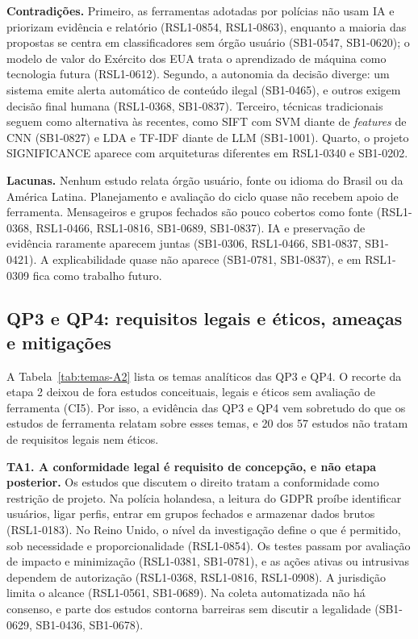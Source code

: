 \textbf{Contradições.} Primeiro, as ferramentas adotadas por polícias não
usam IA e priorizam evidência e relatório (RSL1-0854, RSL1-0863), enquanto a
maioria das propostas se centra em classificadores sem órgão usuário
(SB1-0547, SB1-0620); o modelo de valor do Exército dos EUA trata o
aprendizado de máquina como tecnologia futura (RSL1-0612). Segundo, a
autonomia da decisão diverge: um sistema emite alerta automático de conteúdo
ilegal (SB1-0465), e outros exigem decisão final humana (RSL1-0368,
SB1-0837). Terceiro, técnicas tradicionais seguem como alternativa às
recentes, como SIFT com SVM diante de \textit{features} de CNN (SB1-0827) e
LDA e TF-IDF diante de LLM (SB1-1001). Quarto, o projeto SIGNIFICANCE
aparece com arquiteturas diferentes em RSL1-0340 e SB1-0202.

\textbf{Lacunas.} Nenhum estudo relata órgão usuário, fonte ou idioma do
Brasil ou da América Latina. Planejamento e avaliação do ciclo quase não
recebem apoio de ferramenta. Mensageiros e grupos fechados são pouco
cobertos como fonte (RSL1-0368, RSL1-0466, RSL1-0816, SB1-0689, SB1-0837).
IA e preservação de evidência raramente aparecem juntas (SB1-0306,
RSL1-0466, SB1-0837, SB1-0421). A explicabilidade quase não aparece
(SB1-0781, SB1-0837), e em RSL1-0309 fica como trabalho futuro.

\subsection{QP3 e QP4: requisitos legais e éticos, ameaças e mitigações}
\label{sec:rsl1-qp3-qp4}

A Tabela~\ref{tab:temas-A2} lista os temas analíticos das QP3 e QP4. O
recorte da etapa 2 deixou de fora estudos conceituais, legais e éticos sem
avaliação de ferramenta (CI5). Por isso, a evidência das QP3 e QP4 vem
sobretudo do que os estudos de ferramenta relatam sobre esses temas, e 20
dos 57 estudos não tratam de requisitos legais nem éticos.



\textbf{TA1. A conformidade legal é requisito de concepção, e não etapa
posterior.} Os estudos que discutem o direito tratam a conformidade como
restrição de projeto. Na polícia holandesa, a leitura do GDPR proíbe
identificar usuários, ligar perfis, entrar em grupos fechados e armazenar
dados brutos (RSL1-0183). No Reino Unido, o nível da investigação define o
que é permitido, sob necessidade e proporcionalidade (RSL1-0854). Os testes
passam por avaliação de impacto e minimização (RSL1-0381, SB1-0781), e as
ações ativas ou intrusivas dependem de autorização (RSL1-0368, RSL1-0816,
RSL1-0908). A jurisdição limita o alcance (RSL1-0561, SB1-0689). Na coleta
automatizada não há consenso, e parte dos estudos contorna barreiras sem
discutir a legalidade (SB1-0629, SB1-0436, SB1-0678).

